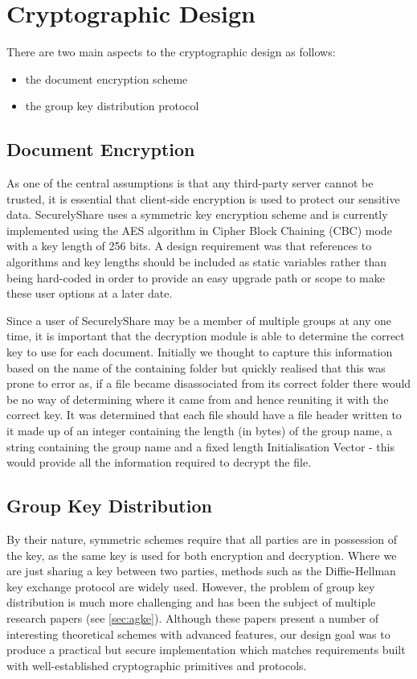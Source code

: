 \section{Cryptographic Design}
\label{sec:crypto}

There are two main aspects to the cryptographic design as follows:
\begin{itemize}
\item the document encryption scheme
\item the group key distribution protocol
\end{itemize} 
\subsection*{Document Encryption}
As one of the central assumptions is that any third-party server cannot be trusted, it is essential that client-side encryption is used to protect our sensitive data.  SecurelyShare uses a symmetric key encryption scheme and is currently implemented using the AES algorithm in Cipher Block Chaining (CBC) mode with a key length of 256 bits.  A design requirement was that references to algorithms and key lengths should be included as static variables rather than being hard-coded in order to provide an easy upgrade path or scope to make these user options at a later date.

Since a user of SecurelyShare may be a member of multiple groups at any one time, it is important that the decryption module is able to determine the correct key to use for each document.  Initially we thought to capture this information based on the name of the containing folder but quickly realised that this was prone to error as, if a file became disassociated from its correct folder there would be no way of determining where it came from and hence reuniting it with the correct key.  It was determined that each file should have a file header written to it made up of an integer containing the length (in bytes) of the group name, a string containing the group name and a fixed length Initialisation Vector - this would provide all the information required to decrypt the file.



\subsection*{Group Key Distribution}
By their nature, symmetric  schemes require that all parties are in possession of the key, as the same key is used for both encryption and decryption.  Where we are just sharing a key between two parties, methods such as the Diffie-Hellman  key exchange protocol \citep{diffie1976new} are widely used.  However, the problem of group key distribution is much more challenging and has been the subject of multiple research papers (see  \ref{sec:agke}).  Although these papers present a number of interesting theoretical schemes with advanced features, our design goal was to produce a practical but secure implementation which matches requirements built with well-established cryptographic primitives and protocols.    


